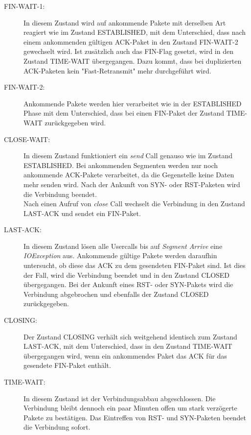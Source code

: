 \begin{description}
\item[FIN-WAIT-1:]

In diesem Zustand wird auf ankommende Pakete mit derselben Art reagiert wie im Zustand ESTABLISHED, mit dem Unterschied, dass nach einem ankommenden gültigen ACK-Paket in den Zustand FIN-WAIT-2 gewechselt wird. Ist zusätzlich auch das FIN-Flag gesetzt, wird in den Zustand TIME-WAIT übergegangen. Dazu kommt, dass bei duplizierten ACK-Paketen kein {}"Fast-Retransmit"{} mehr durchgeführt wird.

\item[FIN-WAIT-2:]	
Ankommende Pakete werden hier verarbeitet wie in der ESTABLISHED Phase mit dem Unterschied, dass bei einen FIN-Paket der Zustand TIME-WAIT zurückgegeben wird.


\item[CLOSE-WAIT:]

In diesem Zustand funktioniert ein \textit{send} Call genauso wie im Zustand ESTABLISHED. Bei ankommenden Segmenten werden nur noch ankommende ACK-Pakete verarbeitet, da die Gegenstelle keine Daten mehr senden wird. Nach der Ankunft von SYN- oder RST-Paketen wird die Verbindung beendet. \\
Nach einen Aufruf von \textit{close} Call wechselt die Verbindung in den Zustand LAST-ACK und sendet ein FIN-Paket.

\item[LAST-ACK:]

In diesem Zustand lösen alle Usercalls bis auf \textit{Segment Arrive} eine \textit{IOException} aus. Ankommende gültige Pakete werden daraufhin untersucht, ob diese das ACK zu dem gesendeten FIN-Paket sind. Ist dies der Fall, wird die Verbindung beendet und in den Zustand CLOSED übergegangen. Bei der Ankunft eines RST- oder SYN-Pakets wird die Verbindung abgebrochen und ebenfalls der Zustand CLOSED zurückgegeben.

\item[CLOSING:]

Der Zustand CLOSING verhält sich weitgehend identisch zum Zustand LAST-ACK, mit dem Unterschied, dass in den Zustand TIME-WAIT übergegangen wird, wenn ein ankommendes Paket das ACK für das gesendete FIN-Paket enthält.


\item[TIME-WAIT:]
In diesem Zustand ist der Verbindungsabbau abgeschlossen. Die Verbindung bleibt dennoch ein paar Minuten offen um stark verzögerte Pakete zu bestätigen. Das Eintreffen von RST- und SYN-Paketen beendet die Verbindung sofort.

\end{description}


